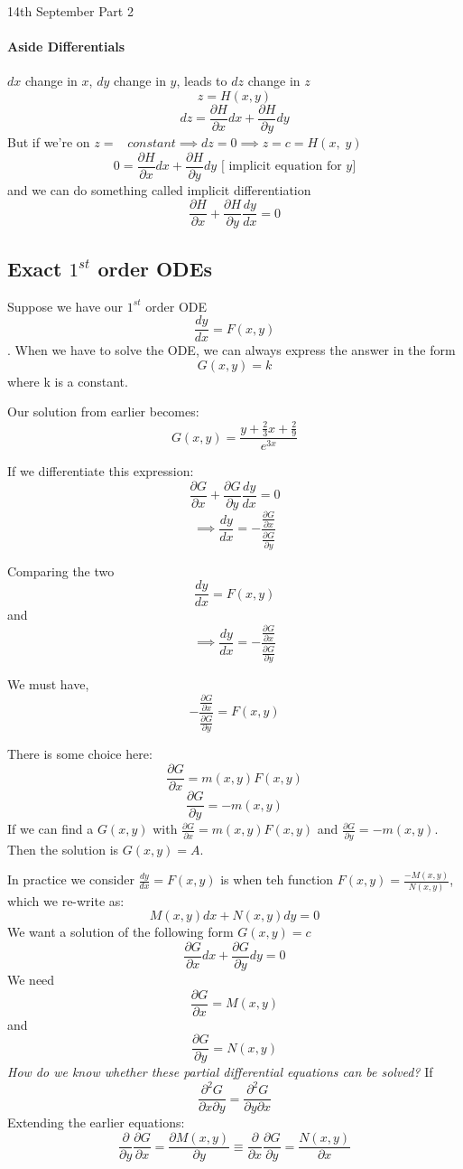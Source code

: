 \documentclass[11pt]{article}
\theoremstyle{definition}
\begin{document}
\begin{center}
    {\LARGE 14th September Part 2}\\
\end{center}

\paragraph{Aside Differentials}
$dx$ change in $x$, $dy$ change in $y$, leads to $dz$ change in $z$
$$z = H(x,y)$$
$$dz = \frac{\partial H}{\partial x}dx + \frac{\partial H}{\partial y} dy$$
But if we're on $z =\;\;\; constant \implies dz = 0 \implies z = c = H(x,\;y)$
$$0 = \frac{\partial H}{\partial x}dx + \frac{\partial H}{\partial y} dy \text{ [         implicit equation for } y]$$ and we can do something called implicit differentiation
$$\frac{\partial H}{\partial x} + \frac{\partial H}{\partial y} \frac{dy}{dx} = 0$$


\subsection{Exact $1^{st}$ order ODEs}
Suppose we have our $1^{st}$ order ODE $$\frac{dy}{dx} = F(x,y)$$. When we have to solve the ODE, we can always express the answer in the form $$G(x,y) = k$$ where k is a constant.

Our solution from earlier becomes: $$G(x,y) = \frac{y + \frac{2}{3}x + \frac{2}{9}}{e^{3x}}$$

If we differentiate this expression: 
$$\frac{\partial G}{\partial x} + \frac{\partial G}{\partial y}\frac{dy}{dx} = 0$$
$$\implies \frac{dy}{dx} = -\frac{\frac{\partial G}{\partial x}}{ \frac{\partial G}{\partial y}}$$

Comparing the two $$\frac{dy}{dx} = F(x,y)$$ and $$\implies \frac{dy}{dx} = -\frac{\frac{\partial G}{\partial x}}{ \frac{\partial G}{\partial y}}$$

We must have, $$-\frac{\frac{\partial G}{\partial x}}{ \frac{\partial G}{\partial y}} = F(x,y)$$

There is some choice here:
$$\frac{\partial G}{\partial x} = m(x,y)F(x,y)$$
$$\frac{\partial G}{\partial y} = -m(x,y)$$
If we can find a $G(x,y)$ with $\frac{\partial G}{\partial x} = m(x,y)F(x,y)$ and
$\frac{\partial G}{\partial y} = -m(x,y)$. Then the solution is $G(x,y) = A$.

In practice we consider $\frac{dy}{dx} = F(x,y)$ is when teh function $F(x,y) = \frac{-M(x,y)}{N(x,y)}$, which we re-write as: $$M(x,y)dx + N(x,y)dy = 0$$
We want a solution of the following form $G(x,y) = c$
$$\frac{\partial G}{\partial x}dx + \frac{\partial G}{\partial y} dy = 0$$
We need         $$\frac{\partial G}{\partial x} = M(x,y)$$ and $$\frac{\partial G}{\partial y} = N(x,y)$$
\textit{How do we know whether these partial differential equations can be solved?}
If
$$\frac{\partial^2G}{\partial x \partial y} = \frac{\partial^2G}{\partial y \partial x}$$
Extending the earlier equations:
$$\frac{\partial }{\partial y}\frac{\partial G}{\partial x} = \frac{\partial M(x,y)}{\partial y} \equiv \frac{\partial }{\partial x}\frac{\partial G}{\partial y} = \frac{N(x,y)}{\partial x}$$
\end{document}
